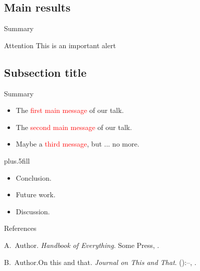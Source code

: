 \documentclass{beamer}
\begin{document}
\subsection{Main results}

\begin{frame}{Summary}
   	\begin{alertblock}{Attention}
   		\textlatin{This is an important alert}
   	\end{alertblock}
\end{frame}

%
\subsection{Subsection title}

\begin{frame}{Summary}
	\begin{itemize}
		\item The \textcolor{red}{first main message} of our talk.
		\item The \textcolor{red}{second main message} of our talk.
		\item Maybe a \textcolor{red}{third message}, but ... no more.
	\end{itemize}
	\vskip0pt plus.5fill
	\begin{itemize}
		\item Conclusion.
	\end{itemize}
	\begin{itemize}
		\item Future work.
		\item Discussion.
	\end{itemize}
\end{frame}

\begin{frame}{References}
	\begin{thebibliography}{2}
		\beamertemplatebookbibitems
		A.\ Author. \newblock\emph{Handbook of Everything}.\newblock
\textlatin{Some Press, }.

		\beamertemplatearticlebibitems
		B.\ Author.\newblock On this and that\emph{.}
\newblock\emph{Journal on This and That}. 
():--, 
.
	\end{thebibliography}
\end{frame}

\end{document}

